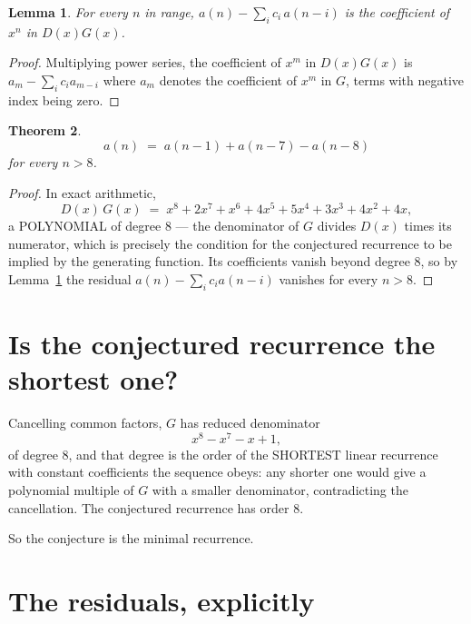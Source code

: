 \documentclass[11pt,a4paper]{article}
\theoremstyle{plain}
\newtheorem{theorem}{Theorem}
\newtheorem{lemma}[theorem]{Lemma}
\theoremstyle{definition}
\begin{document}
\begin{lemma}\label{lem:key}
For every $n$ in range, $a(n)-\sum_i c_i\,a(n-i)$ is the coefficient of $x^{n}$ in
$D(x)G(x)$.
\end{lemma}

\begin{proof}
Multiplying power series, the coefficient of $x^{m}$ in $D(x)G(x)$ is
$a_m-\sum_i c_i a_{m-i}$ where $a_m$ denotes the coefficient of $x^{m}$ in $G$, terms with
negative index being zero.
\end{proof}

\begin{theorem}
\[
a(n)\;=\;a(n-1) + a(n-7) - a(n-8)
\]
for every $n>8$.
\end{theorem}

\begin{proof}
In exact arithmetic,
\[
D(x)\,G(x)\;=\;x^{8} + 2 x^{7} + x^{6} + 4 x^{5} + 5 x^{4} + 3 x^{3} + 4 x^{2} + 4 x,
\]
a POLYNOMIAL of degree $8$ --- the denominator of $G$ divides $D(x)$ times its numerator,
which is precisely the condition for the conjectured recurrence to be implied by the
generating function. Its coefficients vanish beyond degree $8$, so by
Lemma~\ref{lem:key} the residual $a(n)-\sum_ic_ia(n-i)$ vanishes for every
$n>8$.
\end{proof}

\section{Is the conjectured recurrence the shortest one?}

Cancelling common factors, $G$ has reduced denominator
\[
x^{8} - x^{7} - x + 1,
\]
of degree $8$, and that degree is the order of the SHORTEST linear recurrence with
constant coefficients the sequence obeys: any shorter one would give a polynomial multiple of
$G$ with a smaller denominator, contradicting the cancellation. The conjectured recurrence has
order $8$.

So the conjecture is the minimal recurrence.

\section{The residuals, explicitly}
\end{document}
